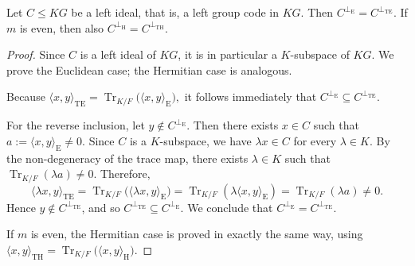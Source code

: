 \documentclass[11pt]{article}
\begin{document}
\begin{proposition}
\label{proposition:Ksubspace-orthogonals}
Let $C\leq KG$ be a left ideal, that is, a left group code in $KG$. Then
$
C^{\perp_{\mathrm{E}}}=C^{\perp_{\mathrm{TE}}}.
$
If $m$ is even, then also
$
C^{\perp_{\mathrm{H}}}=C^{\perp_{\mathrm{TH}}}.
$
\end{proposition}

\begin{proof}
Since $C$ is a left ideal of $KG$, it is in particular a $K$-subspace of $KG$. We prove the Euclidean case; the Hermitian case is analogous.

Because
$
\langle x,y\rangle_{\mathrm{TE}}
=
\operatorname{Tr}_{K/F}\bigl(\langle x,y\rangle_{\mathrm{E}}\bigr),
$
it follows immediately that
$
C^{\perp_{\mathrm{E}}}\subseteq C^{\perp_{\mathrm{TE}}}.
$

For the reverse inclusion, let $y\notin C^{\perp_{\mathrm{E}}}$. Then there exists $x\in C$ such that
$
a:=\langle x,y\rangle_{\mathrm{E}}\neq 0.
$
Since $C$ is a $K$-subspace, we have $\lambda x\in C$ for every $\lambda\in K$. By the non-degeneracy of the trace map, there exists $\lambda\in K$ such that
$
\operatorname{Tr}_{K/F}(\lambda a)\neq 0.
$
Therefore,
$$
\langle \lambda x,y\rangle_{\mathrm{TE}}
=
\operatorname{Tr}_{K/F}\bigl(\langle \lambda x,y\rangle_{\mathrm{E}}\bigr)
=
\operatorname{Tr}_{K/F}(\lambda \langle x,y\rangle_{\mathrm{E}})
=
\operatorname{Tr}_{K/F}(\lambda a)\neq 0.
$$
Hence $y\notin C^{\perp_{\mathrm{TE}}}$, and so
$
C^{\perp_{\mathrm{TE}}}\subseteq C^{\perp_{\mathrm{E}}}.
$
We conclude that
$
C^{\perp_{\mathrm{E}}}=C^{\perp_{\mathrm{TE}}}.
$

If $m$ is even, the Hermitian case is proved in exactly the same way, using
$
\langle x,y\rangle_{\mathrm{TH}}
=
\operatorname{Tr}_{K/F}\bigl(\langle x,y\rangle_{\mathrm{H}}\bigr).
$
\end{proof}
\end{document}

